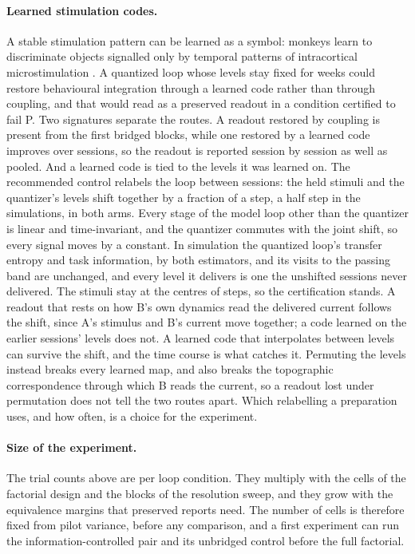 \documentclass[12pt]{article}
\begin{document}
\paragraph{Learned stimulation codes.} A stable stimulation pattern can be
learned as a symbol: monkeys learn to discriminate objects signalled only by
temporal patterns of intracortical microstimulation \citep{odoherty2011}. A
quantized loop whose levels stay fixed for weeks could restore behavioural
integration through a learned code rather than through coupling, and that
would read as a preserved readout in a condition certified to fail P. Two
signatures separate the routes. A readout restored by coupling is present from
the first bridged blocks, while one restored by a learned code improves over
sessions, so the readout is reported session by session as well as pooled. And
a learned code is tied to the levels it was learned on. The recommended control
relabels the loop between sessions: the held stimuli and the quantizer's levels
shift together by a fraction of a step, a half step in the simulations, in both
arms. Every stage of the model loop other than the quantizer is linear and
time-invariant, and the quantizer commutes with the joint shift, so every
signal moves by a constant. In simulation the quantized loop's transfer entropy
and task information, by both estimators, and its visits to the passing band
are unchanged, and every level it delivers is one the unshifted sessions never
delivered. The stimuli stay at the centres of steps, so the certification
stands. A readout that rests on how B's own dynamics read the delivered current
follows the shift, since A's stimulus and B's current move together; a code
learned on the earlier sessions' levels does not. A learned code that interpolates between
levels can survive the shift, and the time course is what catches it. Permuting
the levels instead breaks every learned map, and also breaks the topographic
correspondence through which B reads the current, so a readout lost under
permutation does not tell the two routes apart. Which relabelling a preparation
uses, and how often, is a choice for the experiment.

\paragraph{Size of the experiment.} The trial counts above are per loop
condition. They multiply with the cells of the factorial design and the blocks
of the resolution sweep, and they grow with the equivalence margins that
preserved reports need. The number of cells is therefore fixed from pilot
variance, before any comparison, and a first experiment can run the
information-controlled pair and its unbridged control before the full
factorial.
\end{document}
